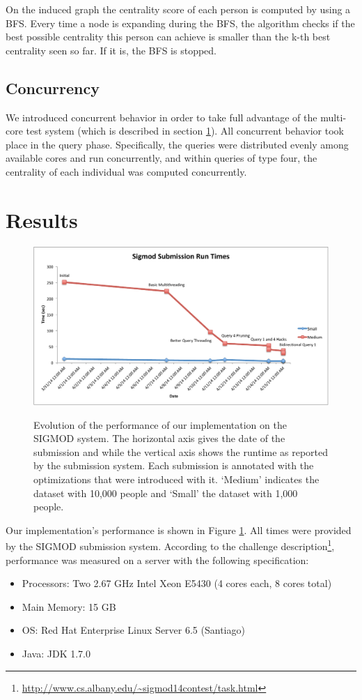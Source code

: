 \documentclass{article}
\begin{document}
On the induced graph the centrality score of each person is computed
by using a BFS. Every time a node is expanding during the BFS, the
algorithm checks if the best possible centrality this person can
achieve is smaller than the k-th best centrality seen so far. If it
is, the BFS is stopped.

\subsection{Concurrency}
We introduced concurrent behavior in order to take full advantage of
the multi-core test system (which is described in section
\ref{sec:results}).  All concurrent behavior took place in the query
phase.  Specifically, the queries were distributed evenly among
available cores and run concurrently, and within queries of type four,
the centrality of each individual was computed concurrently.

\section{Results}
\label{sec:results}
\begin{figure}
  \centering
  \includegraphics[scale=0.5]{img/results.pdf}
  \label{fig:results}
  \caption{Evolution of the performance of our implementation on the
    SIGMOD system.  The horizontal axis gives the date of the
    submission and while the vertical axis shows the runtime as
    reported by the submission system.  Each submission is annotated
    with the optimizations that were introduced with it.  `Medium'
    indicates the dataset with 10,000 people and `Small' the dataset
    with 1,000 people.}
\end{figure}

Our implementation's performance is shown in Figure \ref{fig:results}.  All times were provided by the SIGMOD
submission system.  According to the challenge description\footnote{\url{http://www.cs.albany.edu/~sigmod14contest/task.html}}, performance was measured on a server with the following specification:
\begin{itemize}
\item Processors: Two 2.67 GHz Intel Xeon E5430 (4 cores each, 8 cores total)
\item Main Memory: 15 GB
\item OS: Red Hat Enterprise Linux Server 6.5 (Santiago) 
\item Java: JDK 1.7.0
\end{itemize}
\end{document}
